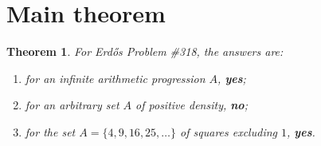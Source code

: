 \documentclass[11pt]{article}
\newtheorem{theorem}{Theorem}
\begin{document}
\section*{Main theorem}

\begin{theorem}
For Erd\H{o}s Problem \#318, the answers are:
\begin{enumerate}[label=\textup{(\arabic*)}]
\item for an infinite arithmetic progression $A$, \textbf{yes};
\item for an arbitrary set $A$ of positive density, \textbf{no};
\item for the set $A=\{4,9,16,25,\dots\}$ of squares excluding $1$, \textbf{yes}.
\end{enumerate}
\end{theorem}
\end{document}
